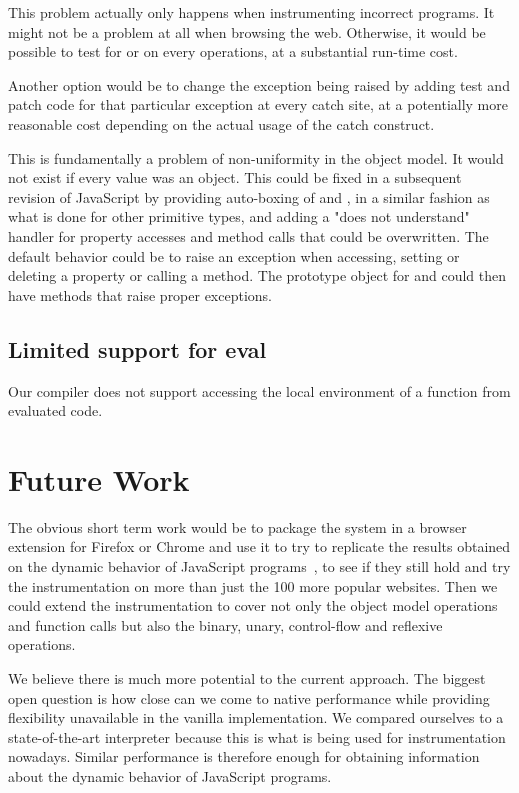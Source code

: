 This problem actually only happens when instrumenting incorrect programs. It
might not be a problem at all when browsing the web. Otherwise, it would be
possible to test for  or  on every operations, at a
substantial run-time cost.

Another option would be to change the exception being raised by adding test and
patch code for that particular exception at every catch site, at a
potentially more reasonable cost depending on the actual usage of the catch
construct.

This is fundamentally a problem of non-uniformity in the object model. It would
not exist if every value was an object.  This could be fixed in a subsequent
revision of JavaScript by providing auto-boxing of  and
, in a similar fashion as what is done for other primitive types,
and adding a "does not understand" handler for property accesses and method
calls that could be overwritten. The default behavior could be to raise an
exception when accessing, setting or deleting a property or calling a method.
The prototype object for  and  could then have methods that
raise proper exceptions.

\subsection{Limited support for eval}

Our compiler does not support accessing the local environment of a function
from evaluated code.

\section{Future Work}

The obvious short term work would be to package the system in a browser
extension for Firefox or Chrome and use it to try to replicate the results
obtained on the dynamic behavior of JavaScript programs~\cite{behavior_js}, to
see if they still hold and try the instrumentation on more than just the 100
more popular websites. Then we could extend the instrumentation to cover not
only the object model operations and function calls but also the binary, unary,
control-flow and reflexive operations.

We believe there is much more potential to the current approach. The
biggest open question is how close can we come to native performance while
providing flexibility unavailable in the vanilla implementation. We compared
ourselves to a state-of-the-art interpreter because this is what is being used
for instrumentation nowadays. Similar performance is therefore enough for
obtaining information about the dynamic behavior of JavaScript programs. 

